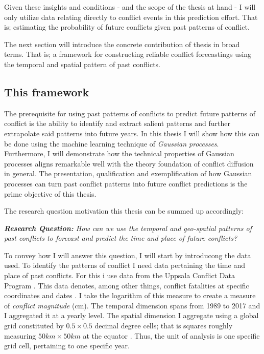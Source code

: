 \documentclass[a4paper]{article}
\begin{document}
Given these insights and conditions - and the scope of the thesis at hand - I will only utilize data relating directly to conflict events in this prediction effort. That is; estimating the probability of future conflicts given past patterns of conflict.\par

The next section will introduce the concrete contribution of thesis in broad terms. That is; a framework for constructing reliable conflict forecastings using the temporal and spatial pattern of past conflicts.\par

\subsection{This framework}

The prerequisite for using past patterns of conflicts to predict future patterns of conflict is the ability to identify and extract salient patterns and further extrapolate said patterns into future years. In this thesis I will show how this can be done using the machine learning technique of \emph{Gaussian processes}. Furthermore, I will demonstrate how the technical properties of Gaussian processes aligns remarkable well with the theory foundation of conflict diffusion in general. The presentation, qualification and exemplification of how Gaussian processes can turn past conflict patterns into future conflict predictions is the prime objective of this thesis.\par

The research question motivation this thesis can be summed up accordingly:\par

\begin{displayquote}

\emph{\textbf{Research Question:} How can we use the temporal and geo-spatial patterns of past conflicts to forecast and predict the time and place of future conflicts?}\par

\end{displayquote}

To convey how I will answer this question, I will start by introducong the data used. To identify the patterns of conflict I need data pertaining the time and place of past conflicts. For this i use data from the Uppsala Conflict Data Program \citep{UCDP_2017}. This data denotes, among other things, conflict fatalities at specific coordinates and dates \citep{UCDP_2017}. I take the logarithm of this measure to create a measure of \emph{conflict magnitude} (cm). The temporal dimension spans from 1989 to 2017 and I aggregated it at a yearly level. The spatial dimension I aggregate using a global grid constituted by $0.5 \times 0.5$ decimal degree cells; that is squares roughly measuring $50km\times50km$ at the equator \citep[367]{Tollefsen_2012}. Thus, the unit of analysis is one specific grid cell, pertaining to one specific year.\par
\end{document}
